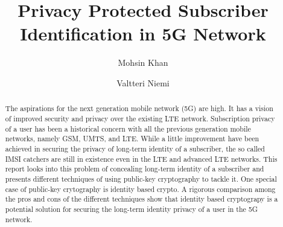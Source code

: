 \documentclass[lnicst,sechang,a4paper]{svmultln}
\begin{document}
\mainmatter  %

\title{Privacy Protected Subscriber Identification in 5G Network}


%
%
\author{Mohsin Khan%
\and Valtteri Niemi}  %


%
%

\maketitle


\begin{abstract}
The aspirations for the next generation mobile network (5G) are high. It has a vision of improved security and privacy over the existing LTE network. Subscription privacy of a user has been a historical concern with all the previous generation mobile networks, namely GSM, UMTS, and LTE. While a little improvement have been achieved in securing the privacy of long-term identity of a subscriber, the so called IMSI catchers are still in existence even in the LTE and advanced LTE networks. This report looks into this problem of concealing long-term identity of a subscriber and presents different techniques of using public-key cryptography to tackle it. One special case of public-key crytography is identity based crypto. A rigorous comparison among the pros and cons of the different techniques show that identity based cryptograpy is a potential solution for securing the long-term identity privacy of a user in the 5G network.
\end{abstract}
\end{document}
